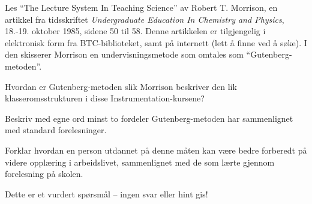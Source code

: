 

Les ``The Lecture System In Teaching Science'' av Robert T. Morrison, en artikkel fra tidsskriftet {\it Undergraduate Education In Chemistry and Physics}, 18.-19. oktober 1985, sidene 50 til 58.  Denne artikkelen er tilgjengelig i elektronisk form fra BTC-biblioteket, samt på internett (lett å finne ved å søke).  I den skisserer Morrison en undervisningsmetode som omtales som ``Gutenberg-metoden''.

\vskip 20pt

Hvordan er Gutenberg-metoden slik Morrison beskriver den lik klasseromsstrukturen i disse Instrumentation-kursene?

\vskip 100pt

Beskriv med egne ord minst to fordeler Gutenberg-metoden har sammenlignet med standard forelesninger.

\vskip 100pt

Forklar hvordan en person utdannet på denne måten kan være bedre forberedt på videre opplæring i arbeidslivet, sammenlignet med de som lærte gjennom forelesning på skolen.

\vfil

\eject






Dette er et vurdert spørsmål -- ingen svar eller hint gis!









